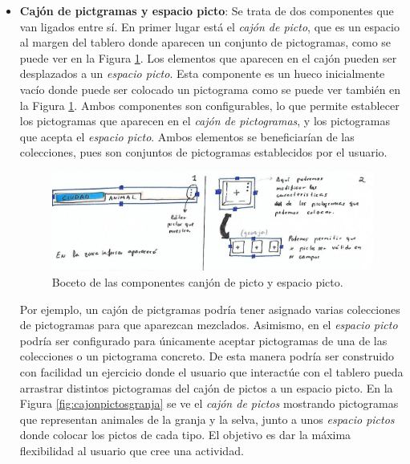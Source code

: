 \begin{itemize}
	
	\item \textbf{Cajón de pictgramas y espacio picto}: Se trata de dos componentes que van ligados entre sí. En primer lugar está el \textit{cajón de picto}, que es un espacio al margen del tablero donde aparecen un conjunto de pictogramas, como se puede ver en la Figura \ref{fig:componentecajon}. Los elementos que aparecen en el cajón pueden  ser desplazados a un \textit{espacio picto}. Esta componente es un hueco inicialmente vacío donde puede ser colocado un pictograma como se puede ver también en la Figura \ref{fig:componentecajon}. Ambos componentes son configurables, lo que permite establecer los pictogramas que aparecen en el \textit{cajón de pictogramas}, y los pictogramas que acepta el \textit{espacio picto}. Ambos elementos se beneficiarían de las colecciones, pues son conjuntos de pictogramas establecidos por el usuario.
	
	\begin{figure}[h!]
		\centering
		\includegraphics[width=0.7\linewidth]{Imagenes/Bitmap/componenteCajon}
		\caption{Boceto de las componentes canjón de picto y espacio picto.}
		\label{fig:componentecajon}
	\end{figure}
	
	
	Por ejemplo, un cajón de pictgramas podría tener asignado varias colecciones de pictogramas para que aparezcan mezclados. Asimismo, en el \textit{espacio picto} podría ser configurado para únicamente aceptar pictogramas de una de las colecciones o un pictograma concreto. De esta manera podría ser construido con facilidad un ejercicio donde el usuario que interactúe con el tablero pueda arrastrar distintos pictogramas del cajón de pictos a un espacio picto. En la Figura \ref{fig:cajonpictosgranja} se ve el \textit{cajón de pictos} mostrando pictogramas que representan animales de la granja y la selva, junto a unos \textit{espacio pictos} donde colocar los pictos de cada tipo.  El objetivo es dar la máxima flexibilidad al usuario que cree una actividad.
	

\end{itemize}
